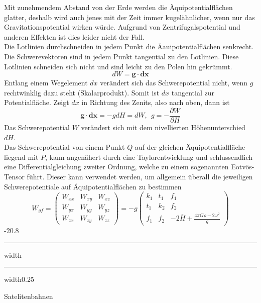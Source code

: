 \documentclass[9pt, landscape, fleqn]{scrartcl}
\makeatletter
\renewcommand{\section}{\@startsection{section}{1}{0mm}%
{-2\baselineskip}{0.8\baselineskip}%
{\hrule depth 0.2pt width\columnwidth\hrule depth1.5pt
width0.25\columnwidth\vspace*{1.2em}\Large\bfseries\rmfamily}}
\makeatother
\begin{document}
\begin{multicols*}{3}
Mit zunehmendem Abstand von der Erde werden die Äquipotentialflächen glatter, deshalb wird auch jenes mit der Zeit immer kugelähnlicher, wenn nur das Gravitationspotential wirken würde. Aufgrund von Zentrifugalspotential und anderen Effekten ist dies leider nicht der Fall. \\

Die Lotlinien durchschneiden in jedem Punkt die Äauipotentialflächen senkrecht. Die Schwerevektoren sind in jedem Punkt tangential zu den Lotlinien. Diese Lotlinien schneiden sich nicht und sind leicht zu den Polen hin gekrümmt.
\begin{equation*}
    dW = \mathbf{g} \cdot \mathbf{dx}
\end{equation*}
Entlang einem Wegelement $dx$ verändert sich das Schwerepotential nicht, wenn $g$ rechtwinklig dazu steht (Skalarprodukt). Somit ist $dx$ tangential zur Potentialfläche. Zeigt $dx$ in Richtung des Zenits, also nach oben, dann ist
\begin{equation*}
    \mathbf{g} \cdot \mathbf{dx} = -g dH = dW,~~ g = -\frac{\partial W}{\partial H}
\end{equation*}
Das Schwerepotential $W$ verändert sich mit dem nivellierten Höhenunterschied $dH$. \\

Das Schwerepotential von einem Punkt $Q$ auf der gleichen Äquipotentialfläche liegend mit $P$, kann angenähert durch eine Taylorentwicklung und schlussendlich eine Differentialgleichung zweiter Ordnung, welche zu einem sogenannten Eotvös-Tensor führt. Dieser kann verwendet werden, um allgemein überall die jeweiligen Schwerepotentiale auf Äquipotentialflächen zu bestimmen
\begin{equation*}
    W_{gf} = \begin{pmatrix}
        W_{xx} & W_{xy} & W_{xz} \\
        W_{yx} & W_{yy} & W_{yz} \\
        W_{zx} & W_{zy} & W_{zz}
    \end{pmatrix} = - g \begin{pmatrix}
        k_1 & t_1 & f_1 \\
        t_1 & k_2 & f_2 \\
        f_1 & f_2 & -2 \overline{H} + \frac{4 \pi G \rho - 2 \omega^2}{g}
    \end{pmatrix}
\end{equation*}
\section{Satelitenbahnen}

\end{multicols*}
\end{document}
